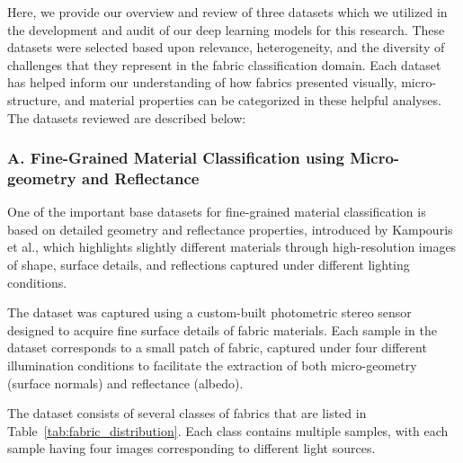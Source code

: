 Here, we provide our overview and review of three datasets which we utilized in the development and audit of our deep learning models for this research. These datasets were selected based upon relevance, heterogeneity, and the diversity of challenges that they represent in the fabric classification domain. Each dataset has helped inform our understanding of how fabrics presented visually, micro-structure, and material properties can be categorized in these helpful analyses. The datasets reviewed are described below:

\subsubsection{A. Fine-Grained Material Classification using Micro-geometry and Reflectance~\cite{kampouris2016fine}}

One of the important base datasets for fine-grained material classification is based on detailed geometry and reflectance properties, introduced by Kampouris et al., which highlights slightly different materials through high-resolution images of shape, surface details, and reflections captured under different lighting conditions.

The dataset was captured using a custom-built photometric stereo sensor designed to acquire fine surface details of fabric materials. Each sample in the dataset corresponds to a small patch of fabric, captured under four different illumination conditions to facilitate the extraction of both micro-geometry (surface normals) and reflectance (albedo).

The dataset consists of several classes of fabrics that are listed in Table~\ref{tab:fabric_distribution}. Each class contains multiple samples, with each sample having four images corresponding to different light sources.

